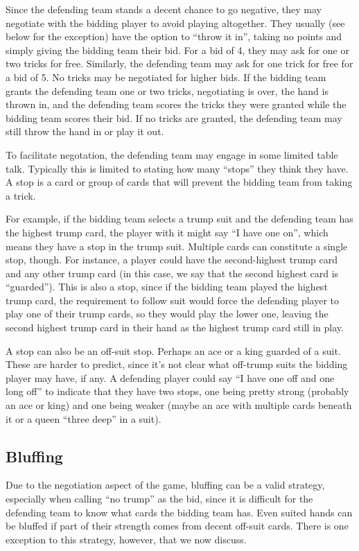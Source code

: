 \documentclass[11pt]{article}
\begin{document}
Since the defending team stands a decent chance to go negative, they may
negotiate with the bidding player to avoid playing altogether. They
usually (see below for the exception) have the option to ``throw it in'', taking no points and simply
giving the bidding team their bid. For a bid of 4, they may ask for one
or two tricks for free. Similarly, the defending team may ask for one
trick for free for a bid of 5. No tricks may be negotiated for higher
bids. If the bidding team grants the defending team one or two tricks,
negotiating is over, the hand is thrown in, and the defending team
scores the tricks they were granted while the bidding team scores their
bid. If no tricks are granted, the defending team may still throw the
hand in or play it out.

To facilitate negotation, the defending team may engage in some limited
table talk. Typically this is limited to stating how many ``stops'' they
think they have. A stop is a card or group of cards that will prevent
the bidding team from taking a trick.

For example, if the bidding team selects a trump suit and the defending
team has the highest trump card, the player with it might say ``I have
one on'', which means they have a stop in the trump suit. Multiple cards
can constitute a single stop, though. For instance, a player could have
the second-highest trump card and any other trump card (in this case, we
say that the second highest card is ``guarded''). This is also a stop,
since if the bidding team played the highest trump card, the requirement
to follow suit would force the defending player to play one of their
trump cards, so they would play the lower one, leaving the second
highest trump card in their hand as the highest trump card still in
play.

A stop can also be an off-suit stop. Perhaps an ace or a king guarded of
a suit. These are harder to predict, since it's not clear what off-trump
suits the bidding player may have, if any. A defending player could say
``I have one off and one long off'' to indicate that they have two
stops, one being pretty strong (probably an ace or king) and one being
weaker (maybe an ace with multiple cards beneath it or a queen ``three
deep'' in a suit).

\subsection{Bluffing}\label{bluffing}

Due to the negotiation aspect of the game, bluffing can be a valid
strategy, especially when calling ``no trump'' as the bid, since it is
difficult for the defending team to know what cards the bidding team
has. Even suited hands can be bluffed if part of their strength comes
from decent off-suit cards. There is one exception to this strategy,
however, that we now discuss.
\end{document}
